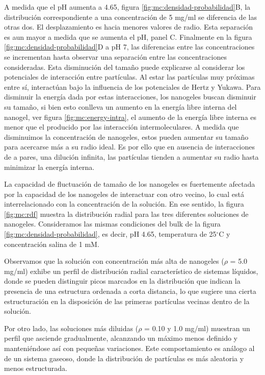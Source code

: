 	A medida que el pH aumenta a 4.65, figura \ref{fig:mc:densidad-probabilidad}B, la distribuci\'on correspondiente a una concentraci\'on de 5 mg/ml se diferencia de las otras dos. El desplazamiento es hacia menores valores de radio. Esta separaci\'on es aun mayor a medida que se aumenta el pH, panel C. Finalmente en la figura \ref{fig:mc:densidad-probabilidad}D a pH 7, las diferencias entre las concentraciones se incrementan hasta observar una separaci\'on entre las concentraciones consideradas. Esta disminuci\'on del tama\~no puede explicarse al considerar los potenciales de interacci\'on entre part\'iculas. Al estar las part\'iculas muy pr\'oximas entre s\'i, interact\'uan bajo la influencia de los potenciales de Hertz y Yukawa. Para disminuir la energ\'ia dada por estas interacciones, los nanogeles buscan disminuir su tama\~no, si bien esto conlleva un aumento en la energ\'ia libre interna del nanogel, ver figura \ref{fig:mc:energy-intra}, el aumento de la energ\'ia libre interna es menor que el producido por las interacci\'on intermoleculares. A medida que disminuimos la concentraci\'on de nanogeles, estos pueden aumentar su tama\~no para acercarse m\'as a su radio ideal. Es por ello que en ausencia de interacciones de a pares, una diluci\'on infinita, las part\'iculas tienden a aumentar su radio hasta minimizar la energ\'ia interna.
	
	La capacidad de fluctuaci\'on de tama\~no de los nanogeles es fuertemente afectada por la capacidad de los nanogeles de interactuar con otro vecino, lo cual est\'a interrelacionado con la concentraci\'on de la soluci\'on.
	En ese sentido, la figura \ref{fig:mc:rdf} muestra la distribuci\'on radial para las tres diferentes soluciones de nanogeles. Consideramos las mismas condiciones del bulk de la figura \ref{fig:mc:densidad-probabilidad}, es decir, pH 4.65, temperatura de 25$^\circ$C y concentraci\'on salina de 1 mM.
	
	Observamos que la soluci\'on con concentraci\'on m\'as alta de nanogeles ($\rho$ = 5.0 mg/ml) exhibe un perfil de distribuci\'on radial caracter\'istico de sistemas l\'iquidos, donde se pueden distinguir picos marcados en la distribuci\'on que indican la presencia de una estructura ordenada a corta distancia, lo que sugiere una cierta estructuraci\'on en la disposici\'on de las primeras part\'iculas vecinas dentro de la soluci\'on.
	
	Por otro lado, las soluciones m\'as diluidas ($\rho$ = 0.10 y 1.0 mg/ml) muestran un perfil que asciende gradualmente, alcanzando un m\'aximo menos definido y manteni\'endose as\'i con peque\~nas variaciones. Este comportamiento es an\'alogo al de un sistema gaseoso, donde la distribuci\'on de part\'iculas es m\'as aleatoria y menos estructurada.
	
